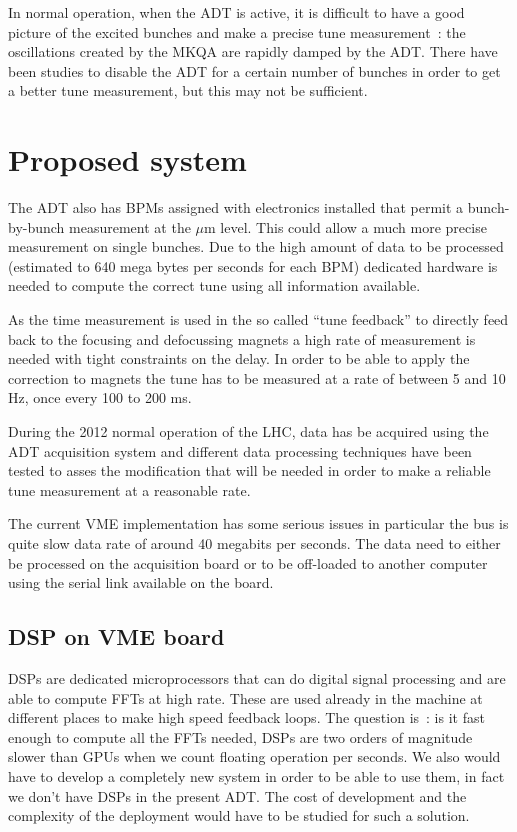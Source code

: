 In normal operation, when the \gls{ADT} is active, it is difficult to have a good picture of the excited bunches and make a precise tune measurement~: the oscillations created by the \gls{MKQA} are rapidly damped by the \gls{ADT}. There have been studies to disable the \gls{ADT} for a certain number of bunches in order to get a better tune measurement\cite{HofleEvian11}, but this may not be sufficient.

\section{Proposed system}

The \gls{ADT} also has \glspl{BPM} assigned with electronics installed that permit a bunch-by-bunch measurement at the $\mu$m level\cite{BphMeas07}. This could allow a much more precise measurement on single bunches. Due to the high amount of data to be processed (estimated to 640 mega bytes per seconds for each \gls{BPM}) dedicated hardware is needed to compute the correct tune using all information available\cite{HofleChamonix12}.

As the time measurement is used in the so called ``tune feedback'' to directly feed back to the focusing and defocussing magnets a high rate of measurement is needed with tight constraints on the delay. In order to be able to apply the correction to magnets the \gls{tune} has to be measured at a rate of between 5 and 10 Hz, once every 100 to 200 ms.

During the 2012 normal operation of the \gls{LHC}, data has be acquired using the \gls{ADT} acquisition system and different data processing techniques have been tested to asses the modification that will be needed in order to make a reliable \gls{tune} measurement at a reasonable rate\cite{HofleChamonix12}.

The current \gls{VME} implementation has some serious issues in particular the bus is quite slow data rate of around 40 megabits per seconds. The data need to either be processed on the acquisition board or to be off-loaded to another computer using the serial link available on the board\cite{Baudrenghien:1124094}.

\subsection{DSP on VME board}

\Glspl{DSP} are dedicated microprocessors that can do digital signal processing and are able to compute \glspl{FFT} at high rate. These are used already in the machine at different places to make high speed feedback loops. The question is~: is it fast enough to compute all the \glspl{FFT} needed, \glspl{DSP} are two orders of magnitude slower than \glspl{GPU} when we count floating operation per seconds. We also would have to develop a completely new system in order to be able to use them, in fact we don't have \glspl{DSP} in the present \gls{ADT}. The cost of development and the complexity of the deployment would have to be studied for such a solution.

